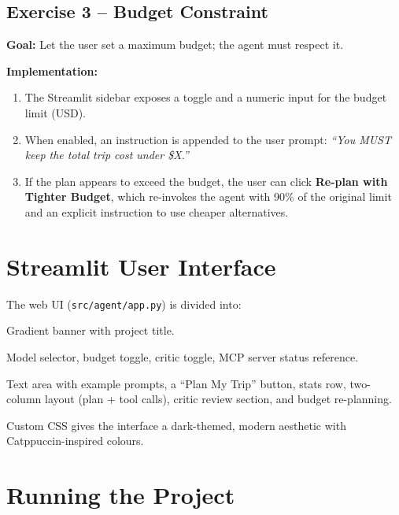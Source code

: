 \documentclass[12pt,a4paper]{article}
\begin{document}
\subsection{Exercise 3 – Budget Constraint}

\textbf{Goal:} Let the user set a maximum budget; the agent must respect it.

\textbf{Implementation:}
\begin{enumerate}[nosep]
  \item The Streamlit sidebar exposes a toggle and a numeric input for the
        budget limit (USD).
  \item When enabled, an instruction is appended to the user prompt:
        \emph{``You MUST keep the total trip cost under \$X.''}
  \item If the plan appears to exceed the budget, the user can click
        \textbf{Re-plan with Tighter Budget}, which re-invokes the agent
        with 90\% of the original limit and an explicit instruction to
        use cheaper alternatives.
\end{enumerate}

\section{Streamlit User Interface}

The web UI (\texttt{src/agent/app.py}) is divided into:

\begin{description}[nosep]
  \item[Header] Gradient banner with project title.
  \item[Sidebar] Model selector, budget toggle, critic toggle, MCP server
        status reference.
  \item[Main area] Text area with example prompts, a ``Plan My Trip''
        button, stats row, two-column layout (plan + tool calls), critic
        review section, and budget re-planning.
\end{description}

Custom CSS gives the interface a dark-themed, modern aesthetic with
Catppuccin-inspired colours.

\section{Running the Project}
\end{document}
